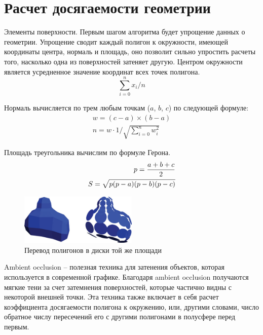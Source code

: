 \clearpage
\section{Расчет досягаемости геометрии}\label{main_part}

Элементы поверхности. Первым шагом алгоритма будет упрощение данных о геометрии. Упрощение сводит каждый полигон к окружности, имеющей координаты центра, нормаль и площадь, оно позволит сильно упростить расчеты того, насколько одна из поверхностей затеняет другую. Центром окружности является усредненное значение координат всех точек полигона.
\begin{equation}
	\sum_{i=0}^{n} x_i / n
\end{equation}

Нормаль вычисляется по трем любым точкам ($a$, $b$, $c$) по следующей формуле:
\begin{equation}\begin{split}
	w = {(c-a) \times (b-a)} \\
	n = w \cdot 1 / \sqrt{\sum_{i=0}^{n} {w_i^2}}
\end{split}\end{equation}

Площадь треугольника вычислим по формуле Герона.
\begin{equation}\begin{split}
	p= {{a+b+c}\over{2}} \\
	S=\sqrt{p(p-a)(p-b)(p-c)}
\end{split}\end{equation}

\begin{figure}[h]
	\center
	\includegraphics[width=0.5\textwidth]{14_ambient_occlusion_02}
	\caption{Перевод полигонов в диски той же площади}\label{fig:ao02}
\end{figure}
Ambient occlusion -- полезная техника для затенения объектов, которая используется в современной графике. Благодаря ambient occlusion получаются мягкие тени за счет затемнения поверхностей, которые частично видны с некоторой внешней точки. Эта техника также включает в себя расчет коэффициента досягаемости полигона к окружению, или, другими словами, число обратное числу пересечений его с другими полигонами в полусфере перед первым.

